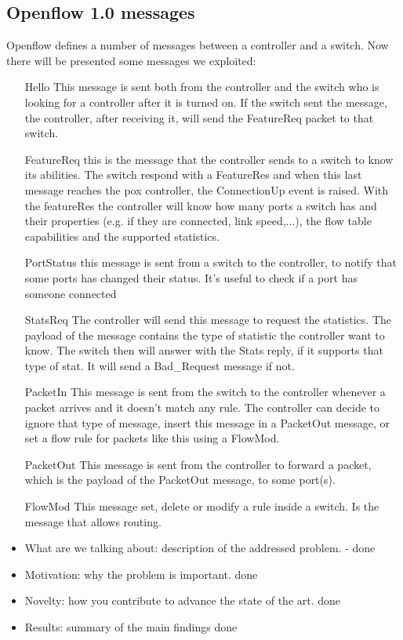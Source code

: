 \documentclass[conference,10pt]{IEEEtran}
\begin{document}
\subsection{Openflow 1.0 messages}
Openflow defines a number of messages between a controller and a switch. Now there will be presented some messages we exploited:
\begin{itemize}
	\item[Hello] This message is sent both from the controller and the switch who is looking for a controller after it
	is turned on. If the switch sent the message, the controller, after receiving it, will send the FeatureReq packet to that switch.
	\item[FeatureReq] this is the message that the controller sends to a switch to know its abilities. The switch
	respond with a FeatureRes and when this last message reaches the pox controller, the ConnectionUp event is raised.
	With the featureRes the controller will know how many ports a switch has and their properties (e.g. if they are connected, link speed,...), the flow table capabilities and the supported statistics.
	\item[PortStatus] this message is sent from a switch to the controller, to notify that some ports has changed their status.
		It's useful to check if a port has someone connected
	\item[StatsReq] The controller will send this message to request the statistics. The payload of the message contains the type of statistic the controller want to know.
		The switch then will answer with the Stats reply, if it supports that type of stat. It will send a Bad_Request message if not.
		\item[PacketIn] This message is sent from the switch to the controller whenever a packet arrives and it doesn't match
		any rule. The controller can decide to ignore that type of message, insert this message in a PacketOut message, or set
		a flow rule for packets like this using a FlowMod.
		\item[PacketOut] This message is sent from the controller to forward a packet, which is the payload of the PacketOut message, to some
		port(s).
		\item[FlowMod] This message set, delete or modify a rule inside a switch. Is the message that allows routing.
\end{itemize}

\begin{itemize}
	\item What are we talking about: description of the addressed problem. - done
\item Motivation: why the problem is important. done
\item Novelty: how you contribute to advance the state of the art. done
\item Results: summary of the main findings  done
\end{itemize}
\end{document}
